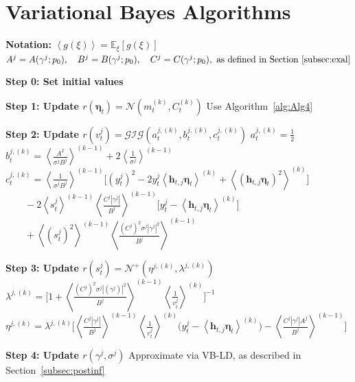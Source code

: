 \documentclass[APA,STIX1COL]{WileyNJD-v2}
\begin{document}
 \clearpage


\section{Variational Bayes Algorithms}

\begin{algorithm}
\caption{Variational Bayes (VB) Algorithm}
\label{alg:Alg3}
\begin{algorithmic}

\State \textbf{Notation:}
\State  $\left\langle g(\xi) \right\rangle = \mathbb{E}_\xi\left[ g(\xi) \right]$
\State  \(
A^j = A(\gamma^j;p_0), \quad B^j = B(\gamma^j;p_0), \quad C^j = C(\gamma^j;p_0), \text{ as defined in Section~\ref{subsec:exal}}
\)
\vspace{0.1cm}
\hline
\vspace{0.1cm}

\State \textbf{Step 0: Set initial values}

    \State \textbf{Step 1: Update $r(\boldsymbol{\eta}_t)=\mathcal{N}(m^{(k)}_t,C^{(k)}_t)$}
    \State Use Algorithm~\ref{alg:Alg4}

        \State \textbf{Step 2: Update $r(v^j_t)=\mathcal{GIG}(a_t^{j,(k)},b_t^{j,(k)},c_t^{j,(k)})$}
            \State $a_t^{j,(k)} = \frac{1}{2}$
            \State $b_t^{j,(k)} = \left\langle \frac{A^2}{\sigma^j B^j} \right\rangle^{(k-1)} + 2 \left\langle \frac{1}{\sigma^j} \right\rangle^{(k-1)}$
            \State $c_t^{j,(k)} = \left\langle \frac{1}{\sigma^j B^j} \right\rangle^{(k-1)} \Big[ (y_t^j)^2 - 2y_t^j \left\langle  \mathbf{h}_{t,j} \boldsymbol{\eta}_t \right\rangle^{(k)} + \left\langle (  \mathbf{h}_{t,j} \boldsymbol{\eta}_t )^2 \right\rangle^{(k)} \Big]$
            \State $\quad \quad -2 \left\langle s^j_t \right\rangle^{(k-1)} \left\langle \frac{C^j|\gamma^j|}{B^j} \right\rangle^{(k-1)} \Big[ y_t^j - \left\langle  \mathbf{h}_{t,j} \boldsymbol{\eta}_t \right\rangle^{(k)} \Big]$
            \State $\quad \quad + \left\langle (s^j_t)^2 \right\rangle^{(k-1)} \left\langle \frac{(C^j)^2\sigma^j|\gamma^j|^2}{B^j} \right\rangle^{(k-1)}$
        \EndFor

        \State \textbf{Step 3: Update $r(s^j_t)=\mathcal{N}^+(\eta^{j,(k)},\lambda^{j,(k)})$}
            \State $\lambda^{j,(k)} = \Big[ 1+\left\langle \frac{(C^j)^2 \sigma^j |(\gamma^j)|^2}{B^j} \right\rangle^{(k-1)} \left\langle \frac{1}{v^j_t} \right\rangle^{(k)} \Big]^{-1}$
            \State $\eta^{j,(k)} = \lambda^{j,(k)}  \Big[ \left\langle \frac{C^j |\gamma^j|}{B^j} \right\rangle^{(k-1)} \left\langle \frac{1}{v^j_t} \right\rangle^{(k)} \Big( y_t^j - \left\langle  \mathbf{h}_{t,j} \boldsymbol{\eta}_t \right\rangle^{(k)} \Big) - \left\langle \frac{C^j |\gamma^j| A^j}{B^j} \right\rangle^{(k-1)} \Big]$
        \EndFor

        \State \textbf{Step 4: Update $r(\gamma^j, \sigma^j )$}
        \State Approximate via VB-LD, as described in Section~\ref{subsec:postinf}
    \EndFor
\EndWhile

\end{algorithmic}
\end{algorithm}
\end{document}
